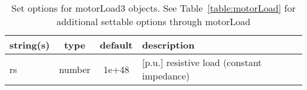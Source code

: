 \begin{table}[ht]
\centering
\begin{tabular}{p{5cm} c c p{7cm}}
\hline
string(s) & type & default & description \\
\hline
rs & number & 1e+48 & [p.u.] resistive load (constant impedance)\\
\hline
\end{tabular}
\caption{Set options for motorLoad3 objects. See Table~\ref{table:motorLoad} for additional settable options through motorLoad}
\label{table:motorLoad3}
\end{table}

